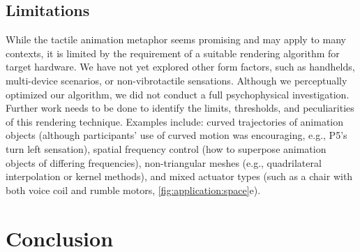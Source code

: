 \subsection{Limitations}
While the tactile animation metaphor seems promising and may apply to many contexts, it is limited by the requirement of a suitable rendering algorithm for target hardware.
We have not yet explored other form factors, such as handhelds, multi-device scenarios, or non-vibrotactile sensations.
Although we perceptually optimized our algorithm, we did not conduct a full psychophysical investigation.
Further work needs to be done to identify the limits, thresholds, and peculiarities of this rendering technique.
Examples include:
curved trajectories of animation objects (although participants' use of curved motion was encouraging, e.g., P5's turn left sensation),
spatial frequency control (how to superpose animation objects of differing frequencies),
non-triangular meshes (e.g., quadrilateral interpolation or kernel methods),
and mixed actuator types (such as a chair with both voice coil and rumble motors, \autoref{fig:application:space}e).

%
%
\section{Conclusion}



